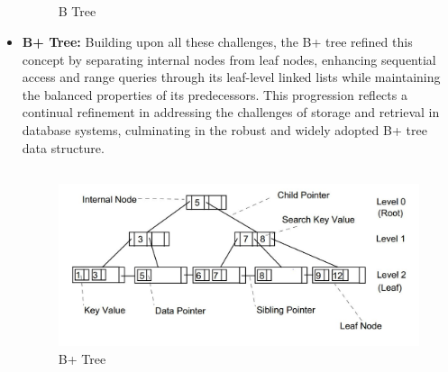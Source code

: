 \documentclass{article}
\begin{document}
\begin{itemize}
        \subsection*{}
        
        \begin{figure}[ht]
            \centering
            \caption{B Tree}
        \end{figure}
        
        \item \textbf{B+ Tree:} Building upon all these challenges, the B+ tree refined this concept by separating internal nodes from leaf nodes, enhancing sequential access and range queries through its leaf-level linked lists while maintaining the balanced properties of its predecessors. This progression reflects a continual refinement in addressing the challenges of storage and retrieval in database systems, culminating in the robust and widely adopted B+ tree data structure.
        \subsection*{}
        
        \begin{figure}
            \centering
            \includegraphics[scale=0.5]{Images/B+tree.jpg}
            \caption{B+ Tree}
        \end{figure}
        
    \end{itemize}
\end{document}

